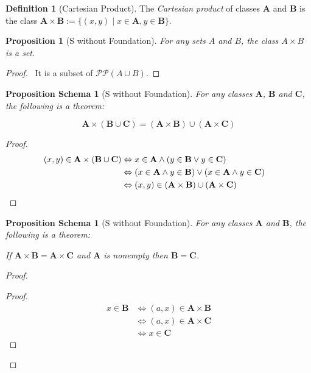 \documentclass{book}
\let\qed\relax
\newtheorem{prop}[ax]{Proposition}
\newtheorem{props}[ax]{Proposition Schema}
\theoremstyle{definition}
\newtheorem{df}[ax]{Definition}
\begin{document}
\begin{df}[Cartesian Product]
The \emph{Cartesian product} of classes $\mathbf{A}$ and $\mathbf{B}$ is the class $\mathbf{A} \times \mathbf{B} := \{(x,y) \mid x \in \mathbf{A}, y \in \mathbf{B}\}$.
\end{df}

\begin{prop}[S without Foundation]
For any sets $A$ and $B$, the class $A \times B$ is a set.
\end{prop}

\begin{proof}
\pf\ It is a subset of $\mathcal{P} \mathcal{P} (A \cup B)$. \qed
\end{proof}

\begin{props}[S without Foundation]
For any classes $\mathbf{A}$, $\mathbf{B}$ and $\mathbf{C}$, the following is a theorem:

\[ \mathbf{A} \times (\mathbf{B} \cup \mathbf{C}) = (\mathbf{A} \times \mathbf{B}) \cup (\mathbf{A} \times \mathbf{C}) \]
\end{props}

\begin{proof}
\pf
\begin{align*}
(x,y) \in \mathbf{A} \times (\mathbf{B} \cup \mathbf{C}) & \Leftrightarrow x \in \mathbf{A} \wedge (y \in \mathbf{B} \vee y \in \mathbf{C}) \\
& \Leftrightarrow (x \in \mathbf{A} \wedge y \in \mathbf{B}) \vee (x \in \mathbf{A} \wedge y \in \mathbf{C}) \\
& \Leftrightarrow (x,y) \in (\mathbf{A} \times \mathbf{B}) \cup (\mathbf{A} \times \mathbf{C}) & \qed
\end{align*}
\end{proof}

\begin{props}[S without Foundation]
For any classes $\mathbf{A}$ and $\mathbf{B}$, the following is a theorem:

If $\mathbf{A} \times \mathbf{B} = \mathbf{A} \times \mathbf{C}$ and $\mathbf{A}$ is nonempty then $\mathbf{B} = \mathbf{C}$.
\end{props}

\begin{proof}
\pf
{}
\begin{proof}
	\pf
	\begin{align*}
		x \in \mathbf{B} & \Leftrightarrow (a,x) \in \mathbf{A} \times \mathbf{B} \\
		& \Leftrightarrow (a,x) \in \mathbf{A} \times \mathbf{C} \\
		& \Leftrightarrow x \in \mathbf{C}
	\end{align*}
\end{proof}
\qed
\end{proof}
\end{document}
